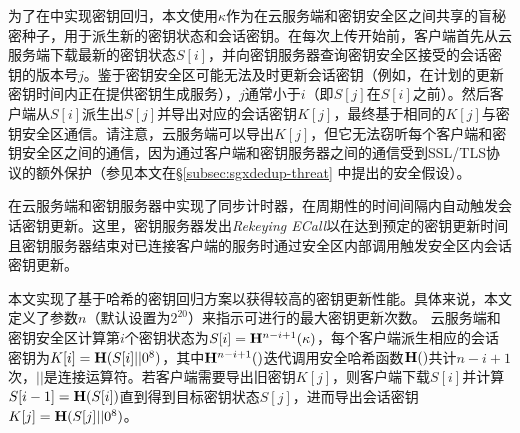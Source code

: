 为了在\sysnameS 中实现密钥回归，本文使用$\kappa$作为在云服务端和密钥安全区之间共享的盲秘密种子，用于派生新的密钥状态和会话密钥。在每次上传开始前，客户端首先从云服务端下载最新的密钥状态$S[i]$，并向密钥服务器查询密钥安全区接受的会话密钥的版本号$j$。鉴于密钥安全区可能无法及时更新会话密钥（例如，在计划的更新密钥时间内正在提供密钥生成服务），$j$通常小于$i$（即$S[j]$在$S[i]$之前）。然后客户端从$S[i]$派生出$S[j]$并导出对应的会话密钥$K[j]$，最终基于相同的$K[j]$与密钥安全区通信。请注意，云服务端可以导出$K[j]$，但它无法窃听每个客户端和密钥安全区之间的通信，因为通过客户端和密钥服务器之间的通信受到SSL/TLS协议的额外保护（参见本文在\S\ref{subsec:sgxdedup-threat} 中提出的安全假设）。

\sysnameS 在云服务端和密钥服务器中实现了同步计时器，在周期性的时间间隔内自动触发会话密钥更新。这里，密钥服务器发出\textit{Rekeying ECall}以在达到预定的密钥更新时间且密钥服务器结束对已连接客户端的服务时通过安全区内部调用触发安全区内会话密钥更新。

本文实现了基于哈希的密钥回归方案\cite{fu06}以获得较高的密钥更新性能。具体来说，本文定义了参数$n$（默认设置为$2^{20}$\cite{fu06}）来指示可进行的最大密钥更新次数。 云服务端和密钥安全区计算第$i$个密钥状态为$S[i] = {\bf H}^{n-i+1}(\kappa)$，每个客户端派生相应的会话密钥为$K[i] = {\bf H}(S[i] || 0^8)$，其中${\bf H}^{n-i+1}()$迭代调用安全哈希函数${\bf H}()$共计$n-i+1$次，$||$是连接运算符。若客户端需要导出旧密钥$K[j]$，则客户端下载$S[i]$并计算$S[i-1] = {\bf H}(S[i])$直到得到目标密钥状态$S[j]$，进而导出会话密钥$K[j] = {\bf H}(S[j] || 0^8)$。
